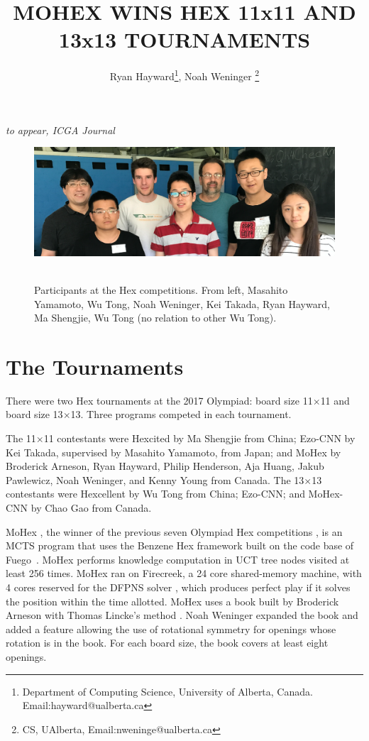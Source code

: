 \documentclass{icga}
\title{\sc MOHEX WINS HEX 11x11 AND 13x13 TOURNAMENTS}
\author{Ryan Hayward\thanks{Department of Computing Science, 
University of Alberta, Canada. Email:hayward@ualberta.ca},
Noah Weninger \thanks{CS, UAlberta, Email:nweninge@ualberta.ca}
}
\affiliation{Edmonton, Canada}
\newif\iflong\longfalse  %
\def\Ec{\mbox{\sc Ezo-CNN}}
\def\Hite{\mbox{\sc Hexcited}}
\def\Hent{\mbox{\sc Hexcellent}}
\def\Mx{\mbox{\sc MoHex}}
\def\Mc{\mbox{\sc MoHex-CNN}}
\def\Fuego{\mbox{\sc Fuego}}
\begin{document}
\maketitle


\vspace*{-2.25in}
{\it to appear, ICGA Journal}
\vspace*{2.0in}

\begin{figure}[hbt]
\includegraphics[width=\columnwidth]{photos/people-1.eps}\
\caption{Participants at the Hex competitions. From left,
Masahito Yamamoto, 
Wu Tong,
Noah Weninger, 
Kei Takada, 
Ryan Hayward, 
Ma Shengjie, 
Wu Tong (no relation to other Wu Tong).} \end{figure}

\section{The Tournaments}
There were two Hex tournaments at the 2017 Olympiad:
board size 11$\times$11 and board size 13$\times$13.
Three programs competed in each tournament.

The 11$\times$11 contestants were
\Hite{} by Ma Shengjie from China;
\Ec{} by Kei Takada, supervised by Masahito Yamamoto, from Japan;
and \Mx{}
by Broderick Arneson, Ryan Hayward, Philip Henderson, Aja Huang, 
Jakub Pawlewicz, Noah Weninger, and Kenny Young from Canada.
The 13$\times$13 contestants were
\Hent{} by Wu Tong from China;
\Ec{}; and
\Mc{} by Chao Gao from Canada.

\Mx{} ,
the winner of the previous seven Olympiad Hex competitions ,
is an MCTS program that uses the Benzene Hex framework
built on the code base of \Fuego\ .
\Mx{} performs knowledge computation 
in UCT tree nodes visited at least 256 times.
\Mx{} ran on Firecreek, a 24 core shared-memory machine, 
with 4 cores reserved for the 
DFPNS solver , which
produces perfect play if it solves the
position within the time allotted.
\Mx{} uses a book built by Broderick Arneson with Thomas Lincke's method 
\citebay{DBLP:conf/cg/Lincke00}. 
Noah Weninger expanded the book and added a feature
allowing the use of rotational symmetry for openings
whose rotation is in the book.
For each board size, the book covers at least eight openings.
\end{document}
